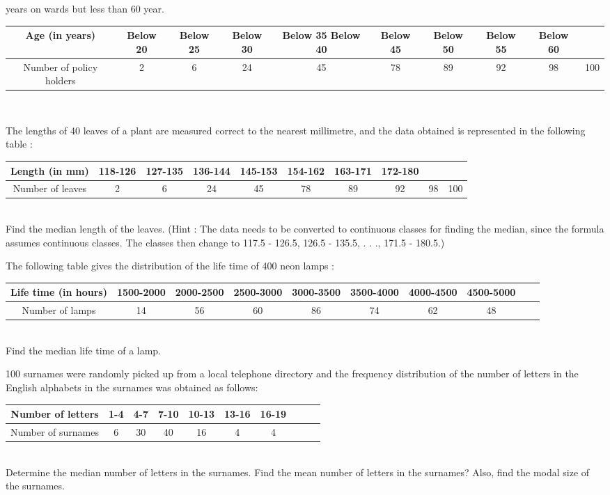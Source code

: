 years on wards but less than 60 year.
\begin{tabular}{|c|c|c|c|c|c|c|c|c|c|}
\hline
Age (in years)&Below 20&Below 25&Below 30&Below 35 Below 40& Below 45& Below 50& Below 55& Below 60\\
\hline
Number of policy holders&2&6&24&45&78&89&92&98&100\\
\hline
\end{tabular}\\
\item The lengths of 40 leaves of a plant are measured correct to the nearest millimetre, and
the data obtained is represented in the following table :
\begin{tabular}{|c|c|c|c|c|c|c|c|c|c|}
\hline
Length (in mm)&118-126&127-135&136-144&145-153&154-162&163-171&172-180\\
\hline
Number of leaves&2&6&24&45&78&89&92&98&100\\
\hline
\end{tabular}\\
Find the median length of the leaves.
(Hint : The data needs to be converted to continuous classes for finding the median,
since the formula assumes continuous classes. The classes then change to
117.5 - 126.5, 126.5 - 135.5, . . ., 171.5 - 180.5.)
\item The following table gives the distribution of the life time of 400 neon lamps :
\begin{tabular}{|c|c|c|c|c|c|c|c|c|c|}
\hline
Life time (in hours)&1500-2000&2000-2500&2500-3000&3000-3500&3500-4000&4000-4500&4500-5000\\
\hline
Number of lamps&14&56&60&86&74&62&48\\
\hline
\end{tabular}\\
Find the median life time of a lamp.
\item 100 surnames were randomly picked up from a local telephone directory and the
frequency distribution of the number of letters in the English alphabets in the surnames
was obtained as follows:
\begin{tabular}{|c|c|c|c|c|c|c|c|c|c|}
\hline
Number of letters&1-4&4-7&7-10&10-13&13-16&16-19\\
\hline
Number of surnames&6&30&40&16&4&4\\
\hline
\end{tabular}\\
Determine the median number of letters in the surnames. Find the mean number of
letters in the surnames? Also, find the modal size of the surnames.
